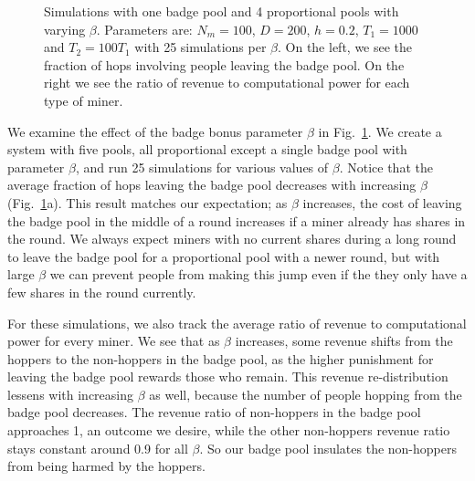 \documentclass{article}
\theoremstyle{plain}
\theoremstyle{definition}
\begin{document}
\begin{figure}
\caption{Simulations with one badge pool and 4 proportional pools with varying $\beta$. Parameters are: $N_m = 100$, $D = 200$, $h = 0.2$, $T_1 = 1000$ and $T_2 = 100T_1$ with 25 simulations per $\beta$. On the left, we see the fraction of hops involving people leaving the badge pool. On the right we see the ratio of revenue to computational power for each type of miner.}
\label{fig:vary_beta}
\end{figure}

We examine the effect of the badge bonus parameter $\beta$ in Fig.~\ref{fig:vary_beta}. We create a system with five pools, all proportional except a single badge pool with parameter $\beta$, and run 25 simulations for various values of $\beta$. Notice that the average fraction of hops leaving the badge pool decreases with increasing $\beta$ (Fig.~\ref{fig:vary_beta}a). This result matches our expectation; as $\beta$ increases, the cost of leaving the badge pool in the middle of a round increases if a miner already has shares in the round. We always expect miners with no current shares during a long round to leave the badge pool for a proportional pool with a newer round, but with large $\beta$ we can prevent people from making this jump even if the they only have a few shares in the round currently.

For these simulations, we also track the average ratio of revenue to computational power for every miner. We see that as $\beta$ increases, some revenue shifts from the hoppers to the non-hoppers in the badge pool, as the higher punishment for leaving the badge pool rewards those who remain. This revenue re-distribution lessens with increasing $\beta$ as well, because the number of people hopping from the badge pool decreases. The revenue ratio of non-hoppers in the badge pool approaches 1, an outcome we desire, while the other non-hoppers revenue ratio stays constant around 0.9 for all $\beta$. So our badge pool insulates the non-hoppers from being harmed by the hoppers. 
\end{document}
